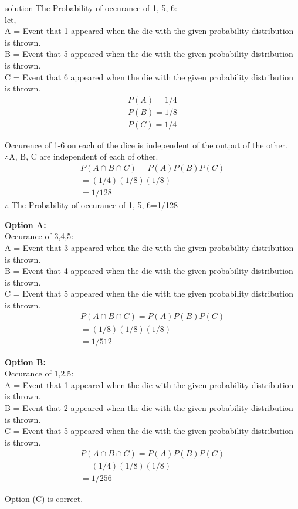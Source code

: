 \documentclass{beamer}
\begin{document}
\begin{frame}{solution}
The Probability of occurance of 1, 5, 6:\\
let,\\
A = Event that 1 appeared when the die with the given probability distribution is thrown.\\
B = Event that 5 appeared when the die with the given probability distribution is thrown.\\
C = Event that 6 appeared when the die with the given probability distribution is thrown.\\
\begin{align}
    P(A) = 1/4\\
    P(B) = 1/8\\
    P(C) =1/4
\end{align}
\end{frame}
\begin{frame}
Occurence of 1-6 on each of the dice is independent of the output of the other.\\
$\therefore$A, B, C are independent of each of other.
\begin{align}
    P(A \cap B \cap C)=P(A) P(B)P(C)\\
    =(1/4)(1/8)(1/8)\\
    =1/128
\end{align}
$\therefore$ The Probability of occurance of 1, 5, 6=1/128
\end{frame}
\begin{frame}
\textbf{Option A:}\\
Occurance of 3,4,5:\\
A = Event that 3 appeared when the die with the given probability distribution is thrown.\\
B = Event that 4 appeared when the die with the given probability distribution is thrown.\\
C = Event that 5 appeared when the die with the given probability distribution is thrown.\\
\begin{align}
    P(A \cap B \cap C)=P(A) P(B)P(C)\\
    =(1/8)(1/8)(1/8)\\
    =1/512
\end{align}
\end{frame}
\begin{frame}
\textbf{Option B:}\\
Occurance of 1,2,5:\\
A = Event that 1 appeared when the die with the given probability distribution is thrown.\\
B = Event that 2 appeared when the die with the given probability distribution is thrown.\\
C = Event that 5 appeared when the die with the given probability distribution is thrown.\\
\begin{align}
    P(A \cap B \cap C)=P(A) P(B)P(C)\\
    =(1/4)(1/8)(1/8)\\
    =1/256
\end{align}

Option (C) is correct.
\end{frame}
\end{document}

